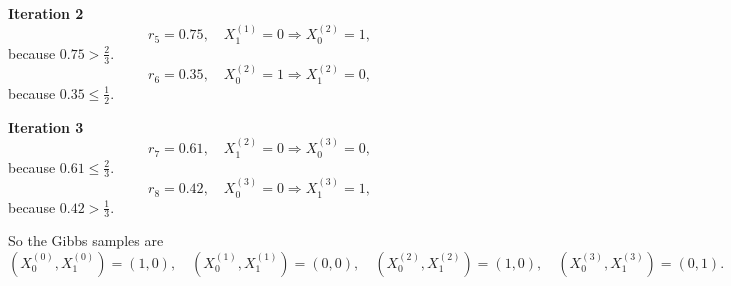 \documentclass[11pt]{article}
\begin{document}
\begin{enumerate}[label=\alph*)]
\textbf{Iteration 2}
\[
r_5=0.75,\quad X_1^{(1)}=0
\Rightarrow X_0^{(2)}=1,
\]
because \(0.75>\tfrac23\).
\[
r_6=0.35,\quad X_0^{(2)}=1
\Rightarrow X_1^{(2)}=0,
\]
because \(0.35\le \tfrac12\).

\textbf{Iteration 3}
\[
r_7=0.61,\quad X_1^{(2)}=0
\Rightarrow X_0^{(3)}=0,
\]
because \(0.61\le \tfrac23\).
\[
r_8=0.42,\quad X_0^{(3)}=0
\Rightarrow X_1^{(3)}=1,
\]
because \(0.42>\tfrac13\).

So the Gibbs samples are
\[
\boxed{
(X_0^{(0)},X_1^{(0)})=(1,0),\quad
(X_0^{(1)},X_1^{(1)})=(0,0),\quad
(X_0^{(2)},X_1^{(2)})=(1,0),\quad
(X_0^{(3)},X_1^{(3)})=(0,1).}
\]
\end{enumerate}
\end{document}
